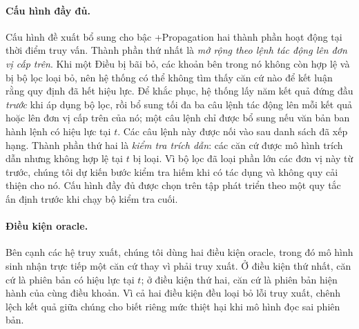 \documentclass[11pt,a4paper]{article}
\begin{document}
\paragraph{Cấu hình đầy đủ.} Cấu hình đề xuất bổ sung cho bậc +Propagation hai thành phần hoạt động tại thời điểm truy vấn. Thành phần thứ nhất là \emph{mở rộng theo lệnh tác động lên đơn vị cấp trên}. Khi một Điều bị bãi bỏ, các khoản bên trong nó không còn hợp lệ và bị bộ lọc loại bỏ, nên hệ thống có thể không tìm thấy căn cứ nào để kết luận rằng quy định đã hết hiệu lực. Để khắc phục, hệ thống lấy năm kết quả đứng đầu \emph{trước} khi áp dụng bộ lọc, rồi bổ sung tối đa ba câu lệnh tác động lên mỗi kết quả hoặc lên đơn vị cấp trên của nó; một câu lệnh chỉ được bổ sung nếu văn bản ban hành lệnh có hiệu lực tại $t$. Các câu lệnh này được nối vào sau danh sách đã xếp hạng. Thành phần thứ hai là \emph{kiểm tra trích dẫn}: các căn cứ được mô hình trích dẫn nhưng không hợp lệ tại $t$ bị loại. Vì bộ lọc đã loại phần lớn các đơn vị này từ trước, chúng tôi dự kiến bước kiểm tra hiếm khi có tác dụng và không quy cải thiện cho nó. Cấu hình đầy đủ được chọn trên tập phát triển theo một quy tắc ấn định trước khi chạy bộ kiểm tra cuối.

\paragraph{Điều kiện oracle.} Bên cạnh các hệ truy xuất, chúng tôi dùng hai điều kiện oracle, trong đó mô hình sinh nhận trực tiếp một căn cứ thay vì phải truy xuất. Ở điều kiện thứ nhất, căn cứ là phiên bản có hiệu lực tại $t$; ở điều kiện thứ hai, căn cứ là phiên bản hiện hành của cùng điều khoản. Vì cả hai điều kiện đều loại bỏ lỗi truy xuất, chênh lệch kết quả giữa chúng cho biết riêng mức thiệt hại khi mô hình đọc sai phiên bản.
\end{document}
